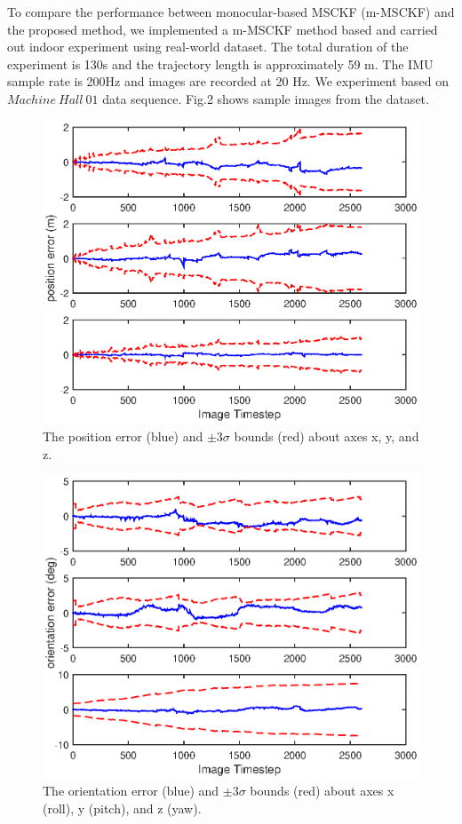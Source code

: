 \documentclass[a4paper, 10pt, conference]{ieeeconf}      %
\begin{document}
To compare the performance between monocular-based MSCKF (m-MSCKF) and the proposed method, we implemented a m-MSCKF method based \cite{mourikis2007multi} and carried out indoor experiment using real-world dataset.  The total duration of the experiment is 130s and the trajectory length is approximately 59 m. The IMU sample rate is 200Hz and images are recorded at 20 Hz. We experiment based on $ Machine \ Hall \ 01 $ data sequence. Fig.2 shows sample images from the dataset.

\begin{figure}[thpb]
	\centering
	
	\includegraphics[scale=0.5]{position_error.eps}
	
	\caption{The position error (blue) and $ \pm 3 \sigma $ bounds (red) about axes x, y, and z. }
	\label{figurelabel}
\end{figure}

\begin{figure}[thpb]
	\centering
	
	\includegraphics[scale=0.5]{orientation_error.eps}
	
	\caption{The orientation error (blue) and $ \pm 3 \sigma $ bounds (red) about axes x (roll), y (pitch), and z (yaw). }
	\label{figurelabel}
\end{figure}
\end{document}
